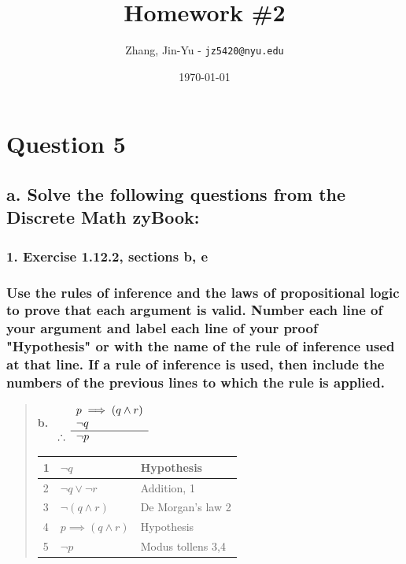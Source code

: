 \documentclass[11pt, oneside]{article}
\title{Homework \#2}
\author{Zhang, Jin-Yu - \texttt{jz5420@nyu.edu}}
\date{\today}
\begin{document}
\maketitle

\pagebreak

\section*{Question 5}

\subsection*{a. Solve the following questions from the Discrete Math zyBook:}

\subsubsection*{1. Exercise 1.12.2, sections b, e}

\subsubsection*{Use the rules of inference and the laws of propositional logic to prove that each argument is valid. Number each line of your argument and label each line of your proof "Hypothesis" or with the name of the rule of inference used at that line. If a rule of inference is used, then include the numbers of the previous lines to which the rule is applied.}

\begin{quote}
    \textbf{b. }
    \(
    \begin{array}{rl}
      & p\implies (q \land r) \\
      & \neg q \\
      \cline{2-2}
    \therefore & \neg p  
    \end{array}
    \)  
    
    \begin{tabular}{|p{0.5cm}|p{5cm}|p{5cm}|}
        \hline
        1 & $\neg q$ & Hypothesis \\
        \hline
        2 & $\neg q \lor \neg r$ & Addition, 1 \\
        \hline
        3 & $\neg (q \land r)$ & De Morgan's law 2 \\
        \hline
        4 & $p\implies (q \land r)$ & Hypothesis \\
        \hline
        5 & $\neg p$ & Modus tollens 3,4 \\
        \hline
    \end{tabular}
\end{quote}
\end{document}

